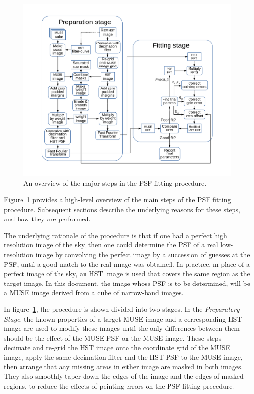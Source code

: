 \documentclass[12pt,twoside,a4paper]{article}
\begin{document}
\begin{figure}[htbp]
\begin{center}
\begin{minipage}[b]{5.5in}
\begin{center}
\includegraphics[width=4.5in]{psf_fitting_procedure.pdf}
\caption{An overview of the major steps in the PSF fitting procedure.}
\label{psf_fitting_procedure_figure}
\end{center}
\end{minipage}
\end{center}
\end{figure}

Figure~\ref{psf_fitting_procedure_figure} provides a high-level
overview of the main steps of the PSF fitting procedure. Subsequent
sections describe the underlying reasons for these steps, and how they
are performed.

The underlying rationale of the procedure is that if one had a perfect
high resolution image of the sky, then one could determine the PSF of
a real low-resolution image by convolving the perfect image by a
succession of guesses at the PSF, until a good match to the real image
was obtained. In practice, in place of a perfect image of the sky, an
HST image is used that covers the same region as the target image. In
this document, the image whose PSF is to be determined, will be a MUSE
image derived from a cube of narrow-band images.

In figure~\ref{psf_fitting_procedure_figure}, the procedure is shown
divided into two stages. In the \textit{Preparatory Stage}, the known
properties of a target MUSE image and a corresponding HST image are
used to modify these images until the only differences between them
should be the effect of the MUSE PSF on the MUSE image. These steps
decimate and re-grid the HST image onto the coordinate grid of the
MUSE image, apply the same decimation filter and the HST PSF to the
MUSE image, then arrange that any missing areas in either image are
masked in both images. They also smoothly taper down the edges of the
image and the edges of masked regions, to reduce the effects of
pointing errors on the PSF fitting procedure.
\end{document}
